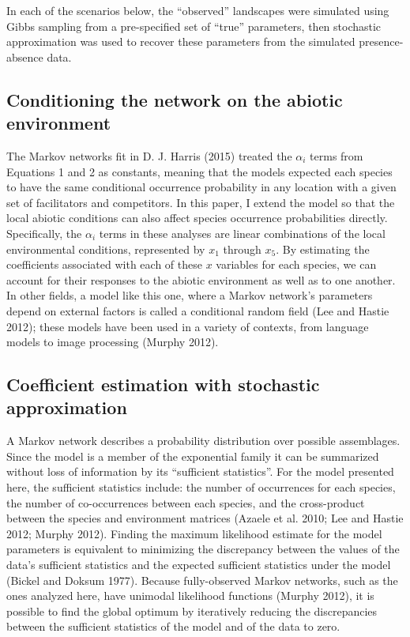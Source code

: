 In each of the scenarios below, the ``observed'' landscapes were
simulated using Gibbs sampling from a pre-specified set of ``true''
parameters, then stochastic approximation was used to recover these
parameters from the simulated presence-absence data.

\subsection{Conditioning the network on the abiotic
environment}\label{conditioning-the-network-on-the-abiotic-environment}

The Markov networks fit in D. J. Harris (2015) treated the \(\alpha_i\)
terms from Equations 1 and 2 as constants, meaning that the models
expected each species to have the same conditional occurrence
probability in any location with a given set of facilitators and
competitors. In this paper, I extend the model so that the local abiotic
conditions can also affect species occurrence probabilities directly.
Specifically, the \(\alpha_i\) terms in these analyses are linear
combinations of the local environmental conditions, represented by
\(x_1\) through \(x_5\). By estimating the coefficients associated with
each of these \(x\) variables for each species, we can account for their
responses to the abiotic environment as well as to one another. In other
fields, a model like this one, where a Markov network's parameters
depend on external factors is called a conditional random field (Lee and
Hastie 2012); these models have been used in a variety of contexts, from
language models to image processing (Murphy 2012).

\subsection{Coefficient estimation with stochastic
approximation}\label{coefficient-estimation-with-stochastic-approximation}

A Markov network describes a probability distribution over possible
assemblages. Since the model is a member of the exponential family it
can be summarized without loss of information by its ``sufficient
statistics''. For the model presented here, the sufficient statistics
include: the number of occurrences for each species, the number of
co-occurrences between each species, and the cross-product between the
species and environment matrices (Azaele et al. 2010; Lee and Hastie
2012; Murphy 2012). Finding the maximum likelihood estimate for the
model parameters is equivalent to minimizing the discrepancy between the
values of the data's sufficient statistics and the expected sufficient
statistics under the model (Bickel and Doksum 1977). Because
fully-observed Markov networks, such as the ones analyzed here, have
unimodal likelihood functions (Murphy 2012), it is possible to find the
global optimum by iteratively reducing the discrepancies between the
sufficient statistics of the model and of the data to zero.

